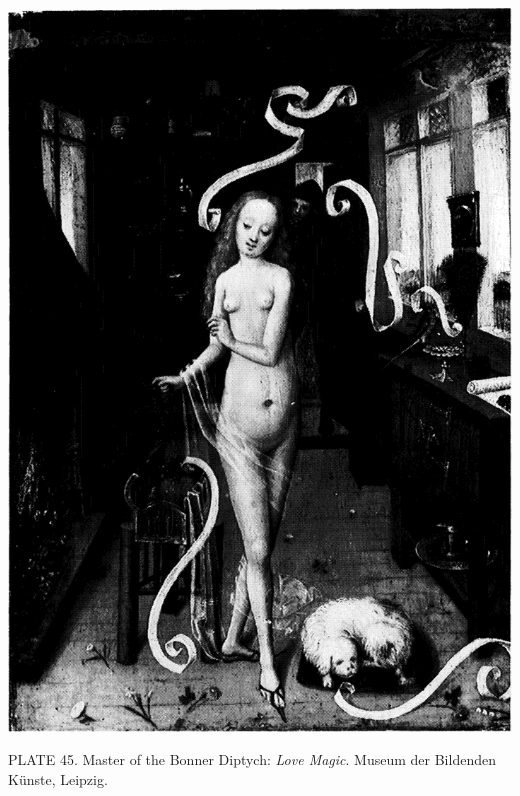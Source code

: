 \protect\hypertarget{20_ILLUSTRATIONS_FOLLOW_PAGE.xhtmlux5cux23id_40}{}{}\includegraphics{include/html/images/360_1.png}

PLATE 45. Master of the Bonner Diptych: \emph{Love Magic}. Museum der
Bildenden Künste, Leipzig.

